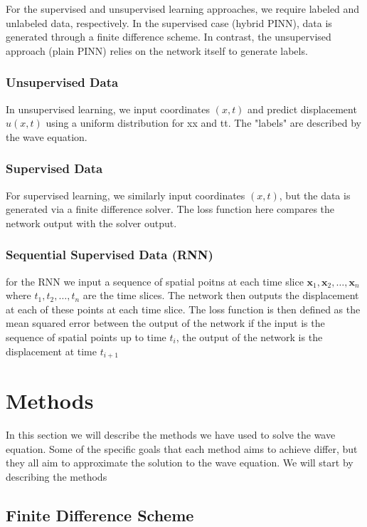 \documentclass[twoside,11pt]{report}
\begin{document}
    For the supervised and unsupervised learning approaches, we require labeled and unlabeled data, 
    respectively. In the supervised case (hybrid PINN), data is generated through a finite difference scheme. 
    In contrast, the unsupervised approach (plain PINN) relies on the network itself to generate labels.

    \subsubsection{Unsupervised Data}
    In unsupervised learning, we input coordinates $(x,t)$ and predict displacement $u(x,t)$ using 
    a uniform distribution for xx and tt. The "labels" are described by the wave equation.

    \subsubsection{Supervised Data}
    For supervised learning, we similarly input coordinates $(x,t)$, but the data is generated via a finite 
    difference solver. The loss function here compares the network output with the solver output.

    \subsubsection{Sequential Supervised Data (RNN)}
    for the RNN we input a sequence of spatial poitns at each time slice $\mathbf{x}_1, \mathbf{x}_2, \dots, \mathbf{x}_n$ 
    where $t_1, t_2, \dots, t_n$ are the time slices. The network then outputs the displacement at each of these points
    at each time slice. The loss function is then defined as the mean squared error between the output of the network
    if the input is the sequence of spatial points up to time $t_i$, the output of the network is the displacement
    at time $t_{i+1}$
    

\section{Methods}
\label{sec:methods}

    In this section we will describe the methods we have used to solve the wave equation.
    Some of the specific goals that each method aims to achieve differ, but they all aim to
    approximate the solution to the wave equation. We will start by describing the methods




\subsection{Finite Difference Scheme}
\label{sec:finite}
\end{document}
